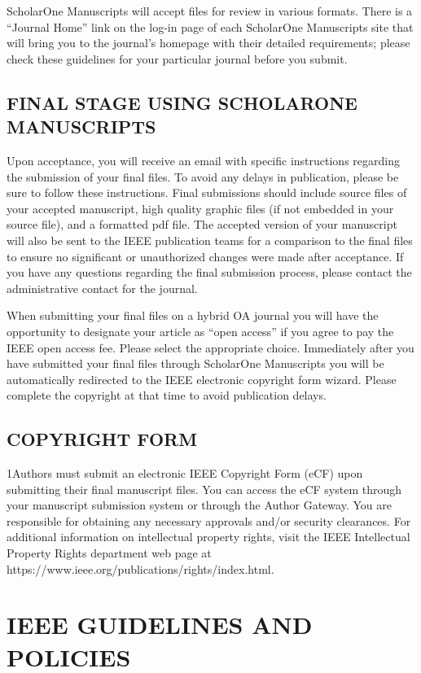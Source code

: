 \documentclass{ieeetj}
\begin{document}
ScholarOne Manuscripts will accept files for review in various formats. There is a ``Journal Home'' link on the log-in page of each ScholarOne Manuscripts site that will bring you to the journal's homepage with their detailed requirements; please check these guidelines for your particular journal before you submit.

\subsection{FINAL STAGE USING SCHOLARONE MANUSCRIPTS}
Upon acceptance, you will receive an email with specific instructions regarding the submission of your final files. To avoid any delays in publication, please be sure to follow these instructions. Final submissions should include source files of your accepted manuscript, high quality graphic files (if not embedded in your source file), and a formatted pdf file. The accepted version of your manuscript will also be sent to the IEEE publication teams for a comparison to the final files to ensure no significant or unauthorized changes were made after acceptance. If you have any questions regarding the final submission process, please contact the administrative contact for the journal. 

When submitting your final files on a hybrid OA journal you will have the opportunity to designate your article as ``open access'' if you agree to pay the IEEE open access fee. Please select the appropriate choice. Immediately after you have submitted your final files through ScholarOne Manuscripts you will be automatically redirected to the IEEE electronic copyright form wizard. Please complete the copyright at that time to avoid publication delays. 

\subsection{COPYRIGHT FORM}
\looseness1Authors must submit an electronic IEEE Copyright Form (eCF) upon submitting
their final manuscript files. You can access the eCF system through your
manuscript submission system or through the Author Gateway. You are
responsible for obtaining any necessary approvals and/or security
clearances. For additional information on intellectual property rights,
visit the IEEE Intellectual Property Rights department web page at
https://\discretionary{}{}{}www.ieee.org/\discretionary{}{}{}publications/\discretionary{}{}{}rights/\discretionary{}{}{}index.html.

\section{IEEE GUIDELINES AND POLICIES}
\end{document}

